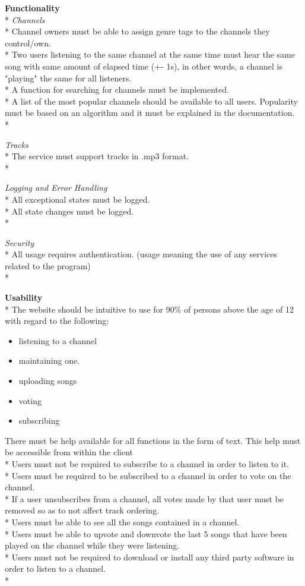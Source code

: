\documentclass[a4paper,11pt,report]{article}
\begin{document}
\textbf{Functionality} \\*
\textit{Channels} \\*
Channel owners must be able to assign genre tags to the channels they control/own. \\*
Two users listening to the same channel at the same time must hear the same song with same amount of elapsed time (+- 1s), in other words, a channel is "playing" the same for all listeners. \\*
A function for searching for channels must be implemented. \\*
A list of the most popular channels should be available to all users. Popularity must be based on an algorithm and it must be explained in the documentation. \\*

\textit{Tracks} \\*
The service must support tracks in .mp3 format. \\*

\textit{Logging and Error Handling} \\*
All exceptional states must be logged.\\*
All state changes must be logged.\\*

\textit{Security} \\*
All usage requires authentication. (usage meaning the use of any services related to the program)\\*

\textbf{Usability} \\*
The website should be intuitive to use for 90\% of persons above the age of 12 with regard to the following:
\begin{itemize}
\item listening to a channel
\item maintaining one. 
\item uploading songs
\item voting
\item subscribing
\end{itemize}

There must be help available for all functions in the form of text. This help must be accessible from within the client \\*
Users must not be required to subscribe to a channel in order to listen to it. \\*
Users must be required to be subscribed to a channel in order to vote on the channel. \\*
If a user unsubscribes from a channel, all votes made by that user must be removed so as to not affect track ordering. \\*
Users must be able to see all the songs contained in a channel. \\*
Users must be able to upvote and downvote the last 5 songs that have been played on the channel while they were listening. \\*
Users must not be required to download or install any third party software in order to listen to a channel. \\*
\end{document}
